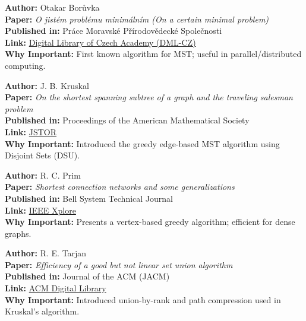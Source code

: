 \documentclass[a4paper,14pt]{extarticle}
\begin{document}
\begin{tcolorbox}[title=1. Borůvka’s Algorithm (1926)]
\textbf{Author:} Otakar Borůvka \\
\textbf{Paper:} \textit{O jistém problému minimálním (On a certain minimal problem)} \\
\textbf{Published in:} Práce Moravské Přírodovědecké Společnosti \\
\textbf{Link:} \href{https://dml.cz/handle/10338.dmlcz/401613}{Digital Library of Czech Academy (DML-CZ)} \\
\textbf{Why Important:} First known algorithm for MST; useful in parallel/distributed computing.
\end{tcolorbox}

\begin{tcolorbox}[title=2. Kruskal’s Algorithm (1956)]
\textbf{Author:} J. B. Kruskal \\
\textbf{Paper:} \textit{On the shortest spanning subtree of a graph and the traveling salesman problem} \\
\textbf{Published in:} Proceedings of the American Mathematical Society \\
\textbf{Link:} \href{https://www.jstor.org/stable/2033241}{JSTOR} \\
\textbf{Why Important:} Introduced the greedy edge-based MST algorithm using Disjoint Sets (DSU).
\end{tcolorbox}

\begin{tcolorbox}[title=3. Prim’s Algorithm (1957)]
\textbf{Author:} R. C. Prim \\
\textbf{Paper:} \textit{Shortest connection networks and some generalizations} \\
\textbf{Published in:} Bell System Technical Journal \\
\textbf{Link:} \href{https://ieeexplore.ieee.org/document/6773135}{IEEE Xplore} \\
\textbf{Why Important:} Presents a vertex-based greedy algorithm; efficient for dense graphs.
\end{tcolorbox}

\begin{tcolorbox}[title=4. Tarjan’s Union-Find Optimization (1975)]
\textbf{Author:} R. E. Tarjan \\
\textbf{Paper:} \textit{Efficiency of a good but not linear set union algorithm} \\
\textbf{Published in:} Journal of the ACM (JACM) \\
\textbf{Link:} \href{https://dl.acm.org/doi/10.1145/321879.321884}{ACM Digital Library} \\
\textbf{Why Important:} Introduced union-by-rank and path compression used in Kruskal’s algorithm.
\end{tcolorbox}
\end{document}
